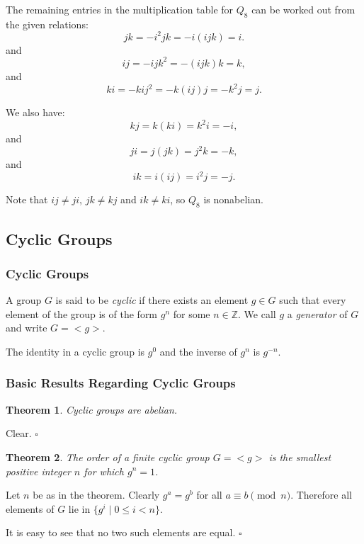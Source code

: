 \documentclass[10pt]{article}
\newcommand{\Z}{\mathbb{Z}}
\newtheorem{theorem}{Theorem}[section]
\newenvironment{proof}[1][Proof]{\begin{trivlist}
\item[\hskip \labelsep {\itshape #1}]}{\end{trivlist}}
\newenvironment{definition}[1][Definition]{\begin{trivlist}
\item[\hskip \labelsep {\bfseries #1}]}{\end{trivlist}}
\begin{document}
The remaining entries in the multiplication table for $Q_8$ can be worked out from the given relations:
$$jk = -i^2jk = -i(ijk) = i.$$
and
$$ij = -ijk^2 = -(ijk)k = k,$$
and
$$ki = -kij^2 = -k(ij)j = -k^2j = j.$$

We also have:
$$kj = k(ki) = k^2i = -i,$$
and
$$ji = j(jk) = j^2k = -k,$$
and
$$ik = i(ij) = i^2j = -j.$$

Note that $ij \neq ji$, $jk \neq kj$ and $ik \neq ki$, so $Q_8$ is nonabelian.

\subsection{Cyclic Groups}

\subsubsection{Cyclic Groups}

\begin{definition}
A group $G$ is said to be \emph{cyclic} if there exists an element $g \in G$ such that every element of the group is of the form $g^n$ for some $n \in \Z$. We call $g$ a \emph{generator} of $G$ and write $G = <g>$.
\end{definition}

The identity in a cyclic group is $g^0$ and the inverse of $g^n$ is $g^{-n}$.

\subsubsection{Basic Results Regarding Cyclic Groups}

\begin{theorem}
Cyclic groups are abelian.
\end{theorem}

\begin{proof}
Clear. $\square$
\end{proof}

\begin{theorem}
The order of a finite cyclic group $G = <g>$ is the smallest positive integer $n$ for which $g^n = 1$.
\end{theorem}

\begin{proof}
Let $n$ be as in the theorem. Clearly $g^a = g^b$ for all $a \equiv b \pmod{n}$. Therefore all elements of $G$ lie in $\{g^i \;|\; 0 \leq i < n\}$.

It is easy to see that no two such elements are equal. $\square$
\end{proof}
\end{document}
